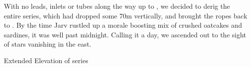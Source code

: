 With no leads, inlets or tubes along the way up to , we decided to derig the entire series, which had dropped some 70m vertically, and brought the ropes back to . By the time Jarv rustled up a morale boosting mix of crushed oatcakes and sardines, it was well past midnight. Calling it a day, we ascended out to the sight of stars vanishing in the east. 


\begin{pagesurvey}
\checkoddpage \ifoddpage \forcerectofloat \else \forceversofloat \fi
{}
\caption[Extended Elevation of Jack of Hearts]{Extended Elevation of \protect{} series}
\end{pagesurvey}
